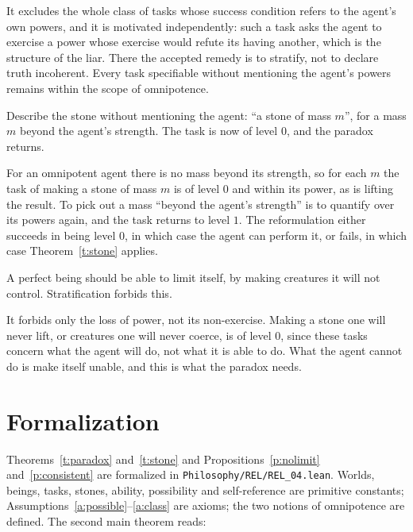 \documentclass{situationist-preprint}
\begin{document}
\begin{reply}
It excludes the whole class of tasks whose success condition refers to the agent's own powers, and it is motivated independently: such a task asks the agent to exercise a power whose exercise would refute its having another, which is the structure of the liar. There the accepted remedy is to stratify, not to declare truth incoherent. Every task specifiable without mentioning the agent's powers remains within the scope of omnipotence.
\end{reply}

\begin{objection}[Reformulation]
Describe the stone without mentioning the agent: \enquote{a stone of mass $m$}, for a mass $m$ beyond the agent's strength. The task is now of level $0$, and the paradox returns.
\end{objection}

\begin{reply}
For an omnipotent agent there is no mass beyond its strength, so for each $m$ the task of making a stone of mass $m$ is of level $0$ and within its power, as is lifting the result. To pick out a mass \enquote{beyond the agent's strength} is to quantify over its powers again, and the task returns to level $1$. The reformulation either succeeds in being level $0$, in which case the agent can perform it, or fails, in which case Theorem~\ref{t:stone} applies.
\end{reply}

\begin{objection}
A perfect being should be able to limit itself, by making creatures it will not control. Stratification forbids this.
\end{objection}

\begin{reply}
It forbids only the loss of power, not its non-exercise. Making a stone one will never lift, or creatures one will never coerce, is of level $0$, since these tasks concern what the agent will do, not what it is able to do. What the agent cannot do is make itself unable, and this is what the paradox needs.
\end{reply}

\section{Formalization}

Theorems~\ref{t:paradox} and~\ref{t:stone} and Propositions~\ref{p:nolimit} and~\ref{p:consistent} are formalized in \nolinkurl{Philosophy/REL/REL_04.lean}. Worlds, beings, tasks, stones, ability, possibility and self-reference are primitive constants; Assumptions~\ref{a:possible}--\ref{a:class} are axioms; the two notions of omnipotence are defined. The second main theorem reads:
\end{document}
